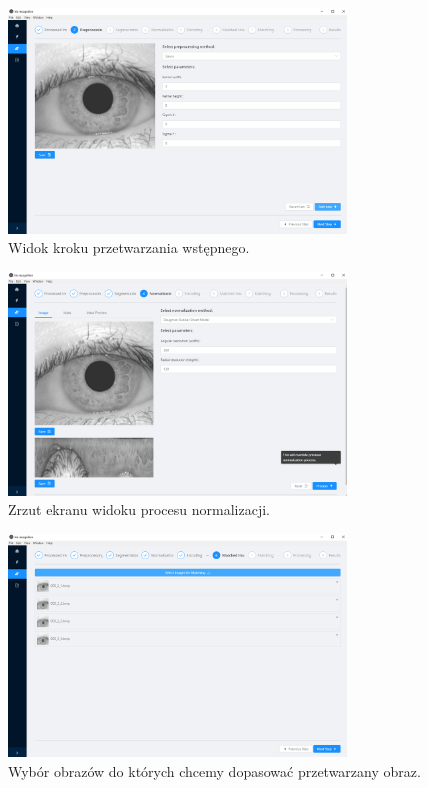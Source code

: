 \documentclass[10pt,polish,a4paper,oneside]{ppfcmthesis}
\begin{document}
\begin{figure}[ht]
  \centering
  \includegraphics[width=0.8\textwidth]{images/app/preprocessing.png}
  \caption{Widok kroku przetwarzania wstępnego.}
  \label{fig:preprocessingScreen}
\end{figure}

\begin{figure}[ht]
  \centering
  \includegraphics[width=0.8\textwidth]{images/app/normalization.png}
  \caption{Zrzut ekranu widoku procesu normalizacji.}
  \label{fig:normScreen}
\end{figure}

\begin{figure}[ht]
  \centering
  \includegraphics[width=0.8\textwidth]{images/app/matchingImages.png}
  \caption{Wybór obrazów do których chcemy dopasowa\'c przetwarzany obraz.}
  \label{fig:matchingImagesScreen}
\end{figure}
\end{document}
